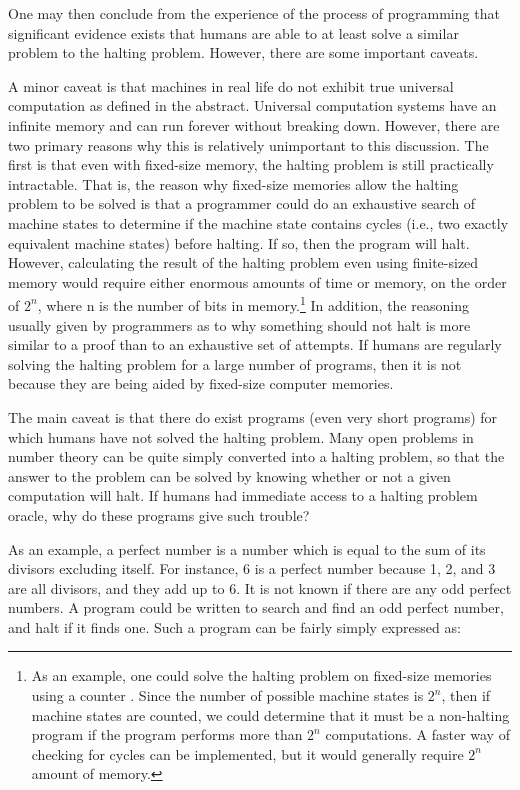 One may then conclude from the experience of the process of programming that significant evidence exists that humans are able to at least solve a similar problem to the halting problem.  However, there are some important caveats.

A minor caveat is that machines in real life do not exhibit true universal computation as defined in the abstract.  Universal computation systems have an infinite memory and can run forever without breaking down.  However, there are two primary reasons why this is relatively unimportant to this discussion.  The first is that even with fixed-size memory, the halting problem is still practically intractable.  That is, the reason why fixed-size memories allow the halting problem to be solved is that a programmer could do an exhaustive search of machine states to determine if the machine state contains cycles (i.e., two exactly equivalent machine states) before halting.  If so, then the program will halt.  However, calculating the result of the halting problem even using finite-sized memory would require either enormous amounts of time or memory, on the order of $2^n$, where n is the number of bits in memory.\footnote{As an example, one could solve the halting problem on fixed-size memories using a counter \citep{gurari1989}.  Since the number of possible machine states is $2^n$, then if machine states are counted, we could determine that it must be a non-halting program if the program performs more than $2^n$ computations.  A faster way of checking for cycles can be implemented, but it would generally require $2^n$ amount of memory.}  In addition, the reasoning usually given by programmers as to why something should not halt is more similar to a proof than to an exhaustive set of attempts.  If humans are regularly solving the halting problem for a large number of programs, then it is not because they are being aided by fixed-size computer memories.

The main caveat is that there do exist programs (even very short programs) for which humans have not solved the halting problem.  Many open problems in number theory can be quite simply converted into a halting problem, so that the answer to the problem can be solved by knowing whether or not a given computation will halt.  If humans had immediate access to a halting problem oracle, why do these programs give such trouble?

As an example, a perfect number is a number which is equal to the sum of its divisors excluding itself.  For instance, 6 is a perfect number because 1, 2, and 3 are all divisors, and they add up to 6.  It is not known if there are any odd perfect numbers.  A program could be written to search and find an odd perfect number, and halt if it finds one.  Such a program can be fairly simply expressed as:

